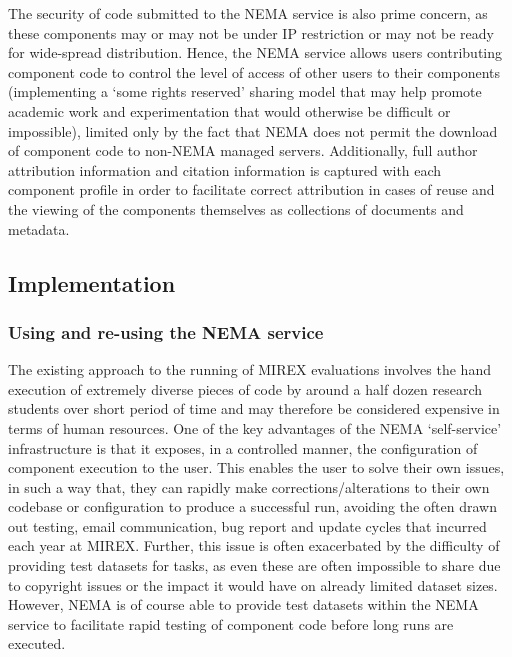 \documentclass[conference]{IEEEtran}
\begin{document}
The security of code submitted to the NEMA service is also prime concern, as these components may or may not be under IP restriction or may not be ready for wide-spread distribution. Hence, the NEMA service allows users contributing component code to control the level of access of other users to their components (implementing a `some rights reserved' sharing model that may help promote academic work and experimentation that would otherwise be difficult or impossible), limited only by the fact that NEMA does not permit the download of component code to non-NEMA managed servers.
Additionally, full author attribution information and citation information is captured with each component profile in order to facilitate correct attribution in cases of reuse and the viewing of the components themselves as collections of documents and metadata. 

\subsection{Implementation}
\subsubsection{Using and re-using the NEMA service}
The existing approach to the running of MIREX evaluations involves the hand execution of extremely diverse pieces of code by around a half dozen research students over short period of time and may therefore be considered expensive in terms of human resources.  One of the key advantages of the NEMA `self-service' infrastructure is that it exposes, in a controlled manner, the configuration of component execution to the user. This enables the user to solve their own issues, in such a way that, they can rapidly make corrections/alterations to their own codebase or configuration to produce a successful run, avoiding the often drawn out testing, email communication, bug report and update cycles that incurred each year at MIREX.
Further, this issue is often exacerbated by the difficulty of providing test datasets for tasks, as even these are often impossible to share due to copyright issues or the impact it would have on already limited dataset sizes. However, NEMA is of course able to provide test datasets within the NEMA service to facilitate rapid testing of component code before long runs are executed. 
\end{document}
